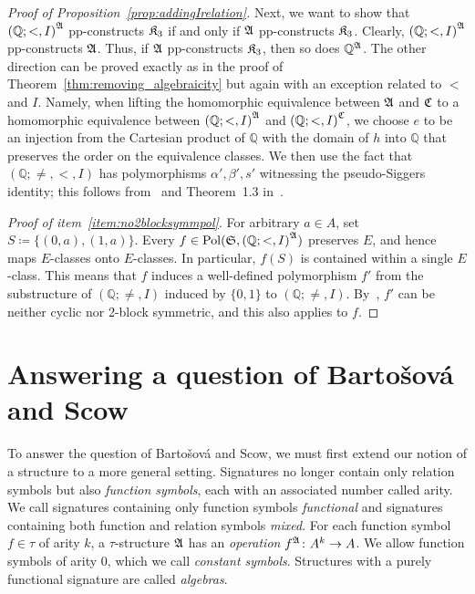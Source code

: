 \begin{proof}[Proof of Proposition~\ref{prop:addingIrelation}]
Next, we want to show that ${(\mathbb{Q};<,I)}^{\mathfrak{A}}$ pp-constructs $\mathfrak{K}_3$ if and only if  $\mathfrak{A}$ pp-constructs $\mathfrak{K}_3$. 
%
Clearly, ${(\mathbb{Q};<,I)}^{\mathfrak{A}}$ pp-constructs $\mathfrak{A}$. Thus, if $\mathfrak{A}$ pp-constructs $\mathfrak{K}_3$, then so does $\mathbb{Q}^{\mathfrak{A}}$. 
% 
The other direction can be proved exactly as in the proof of Theorem~\ref{thm:removing_algebraicity} but again with an exception related to  $<$ and $I$.
%
Namely, when lifting the homomorphic equivalence between $\mathfrak{A}$ and $\mathfrak{C}$ to a homomorphic equivalence between ${(\mathbb{Q};<,I)}^{\mathfrak{A}}$ and ${(\mathbb{Q};<,I)}^{\mathfrak{C}}$, we choose $e$ to be an injection from the Cartesian product of $\mathbb{Q}$ with the domain of $h$ into $\mathbb{Q}$ that preserves the order on the equivalence classes.
%
We then use the fact that $(\mathbb{Q};\neq,<,I)$ has polymorphisms $\alpha',\beta',s'$ witnessing the pseudo-Siggers identity; this follows from~\cite[Theorems~12.0.1,~12.7.3,~12.9.2, and Corollary~6.4.4]{bodirsky2021complexity} and Theorem~1.3 in~\cite{barto2019equations}. 

\textit{Proof of item~\ref{item:no2blocksymmpol}}. For arbitrary 
$a\in A$, set $S \coloneqq \{(0,a),(1,a)\}$.
%
Every $f\in\mathrm{Pol}(\mathfrak{S},{(\mathbb{Q};<,I)}^{\mathfrak{A}})$ preserves $E$, and hence maps $E$-classes onto $E$-classes.
%
In particular, $f(S)$ is contained within a single $E$-class.
%
This means that $f$ induces a well-defined polymorphism $f'$ from the substructure of $(\mathbb{Q};\neq,I)$ induced by $\{0,1\}$ to $(\mathbb{Q};\neq,I)$.
%
By~\cite[Proposition~35]{Mottet_2025}, $f'$ can be neither cyclic nor 2-block symmetric, and this also applies to $f$.
\end{proof}  


\section{Answering a question of Barto\v{s}ov\'{a} and Scow} 

To answer the question of Barto\v{s}ov\'{a} and Scow, we must first extend our notion of a structure to a more general setting.
%
Signatures no longer contain only relation symbols but also \emph{function symbols}, each with an associated number called arity.
%
We call signatures containing only function symbols \emph{functional} and signatures containing both function and relation symbols \emph{mixed}.
%
For each function symbol $f\in \tau$ of arity $k$, a $\tau$-structure $\mathfrak{A}$ has an \emph{operation}  $f^{\mathfrak{A}}\colon A^k\rightarrow A$. 
%
We allow function symbols of arity $0$, which we call \emph{constant symbols}.
%
Structures with a purely functional signature are called \emph{algebras}.

